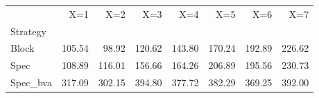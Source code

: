 \begin{tabular}{lrrrrrrr}
\toprule
 & X=1 & X=2 & X=3 & X=4 & X=5 & X=6 & X=7 \\
Strategy &  &  &  &  &  &  &  \\
\midrule
Block & 105.54 & 98.92 & 120.62 & 143.80 & 170.24 & 192.89 & 226.62 \\
Spec & 108.89 & 116.01 & 156.66 & 164.26 & 206.89 & 195.56 & 230.73 \\
Spec_bva & 317.09 & 302.15 & 394.80 & 377.72 & 382.29 & 369.25 & 392.00 \\
\bottomrule
\end{tabular}
